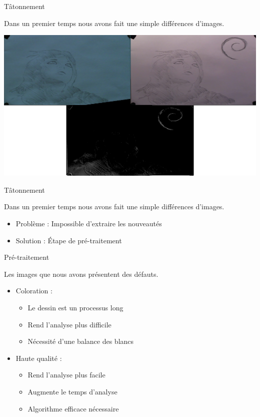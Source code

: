 \documentclass[t,14pt]{beamer}
\begin{document}
\begin{frame}{Tâtonnement}
\begin{block}{}
Dans un premier temps nous avons fait une simple différences d'images.
\end{block}
\begin{center}
\includegraphics[width=\textwidth]{images/evo/diff.png}
\end{center} 
\end{frame}

\begin{frame}{Tâtonnement}
\begin{block}{}
Dans un premier temps nous avons fait une simple différences d'images.
\end{block}
\vspace{5mm}
\begin{itemize}
\item Problème : Impossible d'extraire les nouveautés
\item Solution : \'Etape de pré-traitement
\end{itemize}
\end{frame}

\begin{frame}{Pré-traitement}
\vspace{5mm}
\begin{block}{}
Les images que nous avons présentent des défauts.
\end{block}

\begin{itemize}
\item Coloration : 
	\begin{itemize}
	\item Le dessin est un processus long
	\item Rend l'analyse plus difficile
	\item Nécessité d'une balance des blancs
	\end{itemize}
\item Haute qualité :
	\begin{itemize}
	\item Rend l'analyse plus facile
	\item Augmente le temps d'analyse
	\item Algorithme efficace nécessaire
	\end{itemize}
\end{itemize}
\end{frame}
\end{document}
